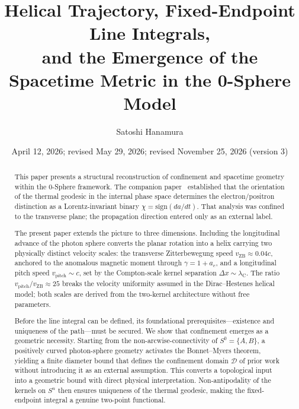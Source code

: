 \documentclass[%
 reprint, amsmath,amssymb, aps, prb, ]{revtex4-2}
\numberwithin{equation}{section}
\newcommand{\lambdaC}{\lambda_{\mathrm{C}}}
\begin{document}

\title{Helical Trajectory, Fixed-Endpoint Line Integrals,\\ and the Emergence of the Spacetime Metric in the 0-Sphere Model}

\author{Satoshi Hanamura}
\date{April 12, 2026; revised May 29, 2026; revised November 25, 2026 (version 3)}

\begin{abstract}
This paper presents a structural reconstruction of confinement and spacetime geometry within the 0-Sphere framework. The companion paper~\cite{hanamura50} established that the orientation of the thermal geodesic in the internal phase space determines the electron/positron distinction as a Lorentz-invariant binary $\chi = \mathrm{sign}(da/dt)$.
That analysis was confined to the transverse plane; the propagation direction entered only as an external label.

The present paper extends the picture to three dimensions.
Including the longitudinal advance of the photon sphere converts the planar rotation into a helix carrying two physically distinct velocity scales: the transverse Zitterbewegung speed $v_{\mathrm{ZB}}\approx 0.04c$, anchored to the anomalous magnetic moment through $\gamma = 1+a_e$, and a longitudinal pitch speed $v_{\mathrm{pitch}}\sim c$, set by the Compton-scale kernel separation $\Delta x\sim\lambdaC$.
The ratio $v_{\mathrm{pitch}}/v_{\mathrm{ZB}}\approx 25$ breaks the velocity uniformity assumed in the Dirac--Hestenes helical model; both scales are derived from the two-kernel architecture without free parameters.

Before the line integral can be defined, its foundational prerequisites---existence and uniqueness of the path---must be secured.
We show that confinement emerges as a geometric necessity.
Starting from the non-arcwise-connectivity of $S^0 = \{A,B\}$, a positively curved photon-sphere geometry activates the Bonnet--Myers theorem, yielding a finite diameter bound that defines the confinement domain $\mathcal{D}$ of prior work~\cite{hanamura33} without introducing it as an external assumption.
This converts a topological input into a geometric bound with direct physical interpretation.
Non-antipodality of the kernels on $S^n$ then ensures uniqueness of the thermal geodesic, making the fixed-endpoint integral a genuine two-point functional.


\end{abstract}
\end{document}
